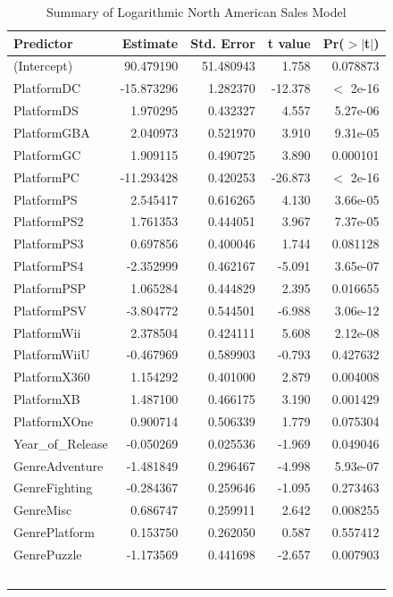 \documentclass[12pt]{article}
\begin{document}
\begin{table}[ht]
  \caption{Summary of Logarithmic North American Sales Model}
  \label{tab:NorthAmericaLog}
  \centering
  \begin{tabular}{lrrrr}
    \hline
    Predictor & Estimate & Std. Error & t value & Pr($>$$|$t$|$) \\
    \hline
    (Intercept) & 90.479190 & 51.480943 & 1.758 & 0.078873 \\
    PlatformDC & -15.873296 & 1.282370 & -12.378 & $<$ 2e-16 \\
    PlatformDS & 1.970295 & 0.432327 & 4.557 & 5.27e-06 \\
    PlatformGBA & 2.040973 & 0.521970 & 3.910 & 9.31e-05 \\
    PlatformGC & 1.909115 & 0.490725 & 3.890 & 0.000101 \\
    PlatformPC & -11.293428 & 0.420253 & -26.873 & $<$ 2e-16 \\
    PlatformPS & 2.545417 & 0.616265 & 4.130 & 3.66e-05 \\
    PlatformPS2 & 1.761353 & 0.444051 & 3.967 & 7.37e-05 \\
    PlatformPS3 & 0.697856 & 0.400046 & 1.744 & 0.081128 \\
    PlatformPS4 & -2.352999 & 0.462167 & -5.091 & 3.65e-07 \\
    PlatformPSP & 1.065284 & 0.444829 & 2.395 & 0.016655 \\
    PlatformPSV & -3.804772 & 0.544501 & -6.988 & 3.06e-12 \\
    PlatformWii & 2.378504 & 0.424111 & 5.608 & 2.12e-08 \\
    PlatformWiiU & -0.467969 & 0.589903 & -0.793 & 0.427632 \\
    PlatformX360 & 1.154292 & 0.401000 & 2.879 & 0.004008 \\
    PlatformXB & 1.487100 & 0.466175 & 3.190 & 0.001429 \\
    PlatformXOne & 0.900714 & 0.506339 & 1.779 & 0.075304 \\
    Year\_of\_Release & -0.050269 & 0.025536 & -1.969 & 0.049046 \\
    GenreAdventure & -1.481849 & 0.296467 & -4.998 & 5.93e-07 \\
    GenreFighting & -0.284367 & 0.259646 & -1.095 & 0.273463 \\
    GenreMisc & 0.686747 & 0.259911 & 2.642 & 0.008255 \\
    GenrePlatform & 0.153750 & 0.262050 & 0.587 & 0.557412 \\
    GenrePuzzle & -1.173569 & 0.441698 & -2.657 & 0.007903 \\
$$
\end{tabular}
\end{table}
\end{document}

